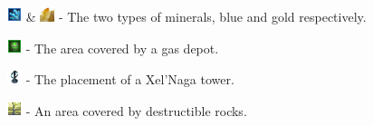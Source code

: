 \begin{my_itemize}
	\item \includegraphics[scale=0.7]{Images/Tiles/BlueMinerals} \& \includegraphics[scale=0.7]{Images/Tiles/GoldMinerals} - The two types of minerals, blue and gold respectively.

	\item \includegraphics[scale=0.7]{Images/Tiles/Gas} - The area covered by a gas depot.

	\item \includegraphics[scale=0.7]{Images/Tiles/XelNaga} - The placement of a Xel'Naga tower.

	\item \includegraphics[scale=0.7]{Images/Tiles/DestructibleRocks} - An area covered by destructible rocks.

\end{my_itemize}